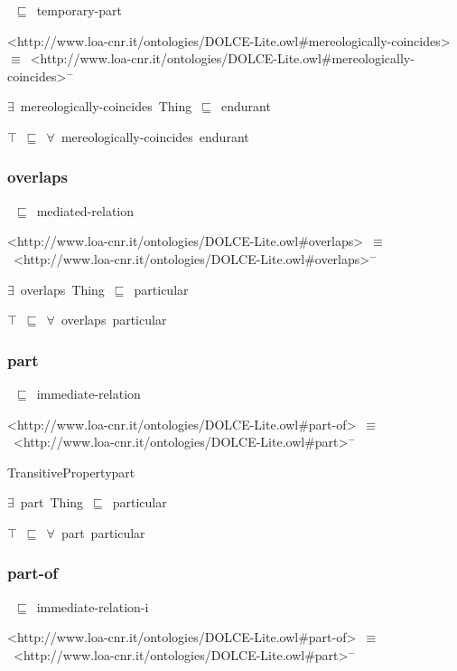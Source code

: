 \documentclass{article}
\begin{document}
~\ensuremath{\sqsubseteq}~temporary-part

<http://www.loa-cnr.it/ontologies/DOLCE-Lite.owl#mereologically-coincides>~\ensuremath{\equiv}~<http://www.loa-cnr.it/ontologies/DOLCE-Lite.owl#mereologically-coincides>\ensuremath{^-}

\ensuremath{\exists}~mereologically-coincides~Thing~\ensuremath{\sqsubseteq}~endurant

\ensuremath{\top}~\ensuremath{\sqsubseteq}~\ensuremath{\forall}~mereologically-coincides~endurant

\subsubsection*{overlaps}

~\ensuremath{\sqsubseteq}~mediated-relation

<http://www.loa-cnr.it/ontologies/DOLCE-Lite.owl#overlaps>~\ensuremath{\equiv}~<http://www.loa-cnr.it/ontologies/DOLCE-Lite.owl#overlaps>\ensuremath{^-}

\ensuremath{\exists}~overlaps~Thing~\ensuremath{\sqsubseteq}~particular

\ensuremath{\top}~\ensuremath{\sqsubseteq}~\ensuremath{\forall}~overlaps~particular

\subsubsection*{part}

~\ensuremath{\sqsubseteq}~immediate-relation

<http://www.loa-cnr.it/ontologies/DOLCE-Lite.owl#part-of>~\ensuremath{\equiv}~<http://www.loa-cnr.it/ontologies/DOLCE-Lite.owl#part>\ensuremath{^-}

TransitivePropertypart

\ensuremath{\exists}~part~Thing~\ensuremath{\sqsubseteq}~particular

\ensuremath{\top}~\ensuremath{\sqsubseteq}~\ensuremath{\forall}~part~particular

\subsubsection*{part-of}

~\ensuremath{\sqsubseteq}~immediate-relation-i

<http://www.loa-cnr.it/ontologies/DOLCE-Lite.owl#part-of>~\ensuremath{\equiv}~<http://www.loa-cnr.it/ontologies/DOLCE-Lite.owl#part>\ensuremath{^-}
\end{document}
